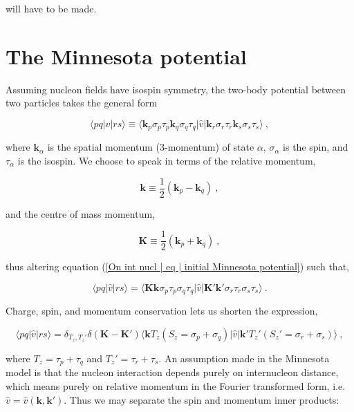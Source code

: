 \documentclass[10pt,twoside]{report}
\begin{document}
	\noindent will have to be made.
	
	\section{The Minnesota potential}
	\label{Nuclear chapter | sec | Minnesota}
	Assuming nucleon fields have isospin symmetry, the two-body potential between two particles takes the general form
	
	\begin{equation}
		\langle pq|\hat{v}|rs\rangle \equiv \langle \bm{k}_p\sigma_p\tau_p\bm{k}_q\sigma_q\tau_q |\hat{v}| \bm{k}_r\sigma_r\tau_r\bm{k}_s\sigma_s\tau_s\rangle \:,
		\label{On int nucl | eq | initial Minnesota potential}
	\end{equation}
	
	\noindent where $\bm{k}_\alpha$ is the spatial momentum (3-momentum) of state $\alpha$, $\sigma_\alpha$ is the spin, and $\tau_\alpha$ is the isospin. We choose to speak in terms of the relative momentum,
	
	\begin{equation}
		\bm{k} \equiv \frac{1}{2}(\bm{k}_p - \bm{k}_q)\:,
	\end{equation}
	
	\noindent and the centre of mass momentum,
	
	\begin{equation}
		\bm{K} \equiv \frac{1}{2}(\bm{k}_p + \bm{k}_q)\:,
	\end{equation}
	
	\noindent thus altering equation (\ref{On int nucl | eq | initial Minnesota potential}) such that,
	
	\begin{equation}
		\langle pq|\hat{v}|rs\rangle = \langle \bm{K}\bm{k}\sigma_p\tau_p\sigma_q\tau_q |\hat{v}| \bm{K}'\bm{k}'\sigma_r\tau_r\sigma_s\tau_s\rangle \:.
	\end{equation}
	
	Charge, spin, and momentum conservation lets us shorten the expression,
	
	\begin{equation}
		\langle pq|\hat{v}|rs\rangle = \delta_{T_z,T_z'}\delta(\bm{K}-\bm{K}')\langle \bm{k}T_z(S_z=\sigma_p+\sigma_q) |\hat{v}| \bm{k}'T_z'(S_z'=\sigma_r+\sigma_s)\rangle \:,
	\end{equation}
	
	\noindent where $T_z=\tau_p+\tau_q$ and $T_z'=\tau_r+\tau_s$. An assumption made in the Minnesota model is that the nucleon interaction depends purely on internucleon distance, which means purely on relative momentum in the Fourier transformed form, i.e. $\hat{v} = \hat{v}(\bm{k},\bm{k}')$. Thus we may separate the spin and momentum inner products:
	
\end{document}
